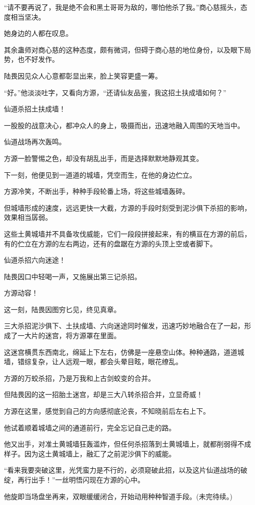 \begin{this_body}
“请不要再说了，我是绝不会和黑土哥哥为敌的，哪怕他杀了我。”商心慈摇头，态度相当坚决。

她身边的人都在叹息。

其余蛊师对商心慈的这种态度，颇有微词，但碍于商心慈的地位身份，以及眼下局势，也不好发作。

陆畏因见众人心意都彰显出来，脸上笑容更盛一筹。

“好。”他淡淡吐字，又看向方源，“还请仙友品鉴，我这招土扶成墙如何？”

仙道杀招土扶成墙！

一股股的战意决心，都冲众人的身上，吸摄而出，迅速地融入周围的天地当中。

仙道战场再次轰鸣。

方源一脸警惕之色，却没有胡乱出手，而是选择默默地静观其变。

下一刻，他便见到一道道的城墙，凭空而生，在他的身边伫立。

方源冷笑，不断出手，种种手段轮番上场，将这些城墙轰碎。

但城墙形成的速度，远远更快一大截，方源的手段时刻受到泥沙俱下杀招的影响，效果相当孱弱。

这些土黄城墙并不具备攻伐威能，它们一段段拼接起来，有的横亘在方源的前后，有的伫立在方源的左右两边，还有的盘踞在方源的头顶上空或者脚下。

仙道杀招六向迷途！

陆畏因口中轻喝一声，又施展出第三记杀招。

方源动容！

这一刻，陆畏因图穷匕见，终见真章。

三大杀招泥沙俱下、土扶成墙、六向迷途同时催发，迅速巧妙地融合在了一起，形成了一大片的迷宫，将方源罩在里面。

这迷宫横贯东西南北，绵延上下左右，仿佛是一座悬空山体。种种通路，道道城墙，错综复杂，让人远观一眼，都会头晕目眩，眼花缭乱。

方源的万蛟杀招，乃是万我和上古剑蛟变的合并。

但陆畏因的这一招胎土迷宫，却是三大八转杀招合并，立显奇威！

方源在这里，感觉到自己的方向感彻底沦丧，不知晓前后左右上下。

他试着顺着城墙之间的通道前行，完全忘记自己走的路。

他又出手，对准土黄城墙狂轰滥炸，但任何杀招落到土黄城墙上，就都削弱得不成样子。因为这土黄城墙上，融汇了之前泥沙俱下的威能。

“看来我要突破这里，光凭蛮力是不行的，必须窥破此招，以及这片仙道战场的破绽，再行出手！”一丝明悟闪现在方源的心中。

他旋即当场盘坐再来，双眼缓缓闭合，开始动用种种智道手段。(未完待续。)

\end{this_body}


